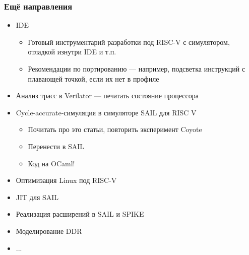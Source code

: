 \documentclass{slides-style}
\begin{document}
    \begin{frame}
        \frametitle{Ещё направления}
        \begin{itemize}
            \item IDE
            \begin{itemize}
                \item Готовый инструментарий разработки под RISC-V с симулятором, отладкой изнутри IDE и т.п.
                \item Рекомендации по портированию --- например, подсветка инструкций с плавающей точкой, если их нет в профиле
            \end{itemize}
            \item Анализ трасс в Verilator --- печатать состояние процессора
            \item Cycle-accurate-симуляция в симуляторе SAIL для RISC V
            \begin{itemize}
                \item Почитать про это статьи, повторить эксперимент Coyote
                \item Перенести в SAIL
                \item Код на OCaml!
            \end{itemize}
            \item Оптимизация Linux под RISC-V
            \item JIT для SAIL
            \item Реализация расширений в SAIL и SPIKE
            \item Моделирование DDR
            \item ...
        \end{itemize}
    \end{frame}
\end{document}
